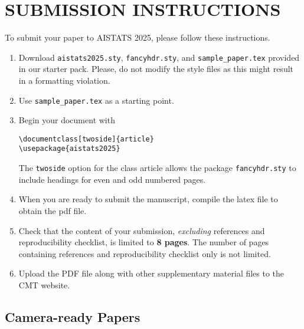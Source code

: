 \documentclass[twoside]{article}
\begin{document}
\section{SUBMISSION INSTRUCTIONS}

To submit your paper to AISTATS 2025, please follow these instructions.

\begin{enumerate}
    \item Download \texttt{aistats2025.sty}, \texttt{fancyhdr.sty}, and \texttt{sample\_paper.tex} provided in our starter pack. 
    Please, do not modify the style files as this might result in a formatting violation.
    
    \item Use \texttt{sample\_paper.tex} as a starting point.
    \item Begin your document with
    \begin{flushleft}
    \texttt{\textbackslash documentclass[twoside]\{article\}}\\
    \texttt{\textbackslash usepackage\{aistats2025\}}
    \end{flushleft}
    The \texttt{twoside} option for the class article allows the
    package \texttt{fancyhdr.sty} to include headings for even and odd
    numbered pages.
    \item When you are ready to submit the manuscript, compile the latex file to obtain the pdf file.
    \item Check that the content of your submission, \emph{excluding} references and reproducibility checklist, is limited to \textbf{8 pages}. The number of pages containing references and reproducibility checklist only is not limited.
    \item Upload the PDF file along with other supplementary material files to the CMT website.
\end{enumerate}

\subsection{Camera-ready Papers}

\end{document}
